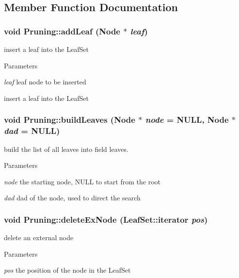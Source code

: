 \subsection{Member Function Documentation}
\hypertarget{classPruning_a6000133f6408dba298337f873dd1d165}{
\subsubsection[{addLeaf}]{\setlength{\rightskip}{0pt plus 5cm}void Pruning::addLeaf ({\bf Node} $\ast$ {\em leaf})}}
\label{classPruning_a6000133f6408dba298337f873dd1d165}
insert a leaf into the LeafSet 
\begin{DoxyParams}{Parameters}
\item[{\em leaf}]leaf node to be inserted\end{DoxyParams}
insert a leaf into the LeafSet \hypertarget{classPruning_aeb07f089da3792788648d2b8d7d702ca}{
\subsubsection[{buildLeaves}]{\setlength{\rightskip}{0pt plus 5cm}void Pruning::buildLeaves ({\bf Node} $\ast$ {\em node} = {\ttfamily NULL}, \/  {\bf Node} $\ast$ {\em dad} = {\ttfamily NULL})}}
\label{classPruning_aeb07f089da3792788648d2b8d7d702ca}
build the list of all leaves into field leaves. 
\begin{DoxyParams}{Parameters}
\item[{\em node}]the starting node, NULL to start from the root \item[{\em dad}]dad of the node, used to direct the search \end{DoxyParams}
\hypertarget{classPruning_ab3423a1002c0eb4af4568f9accac93fa}{
\subsubsection[{deleteExNode}]{\setlength{\rightskip}{0pt plus 5cm}void Pruning::deleteExNode (LeafSet::iterator {\em pos})}}
\label{classPruning_ab3423a1002c0eb4af4568f9accac93fa}
delete an external node 
\begin{DoxyParams}{Parameters}
\item[{\em pos}]the position of the node in the LeafSet \end{DoxyParams}
